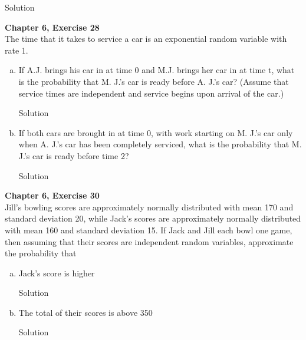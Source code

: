 \documentclass{article}
\begin{document}
\begin{spacing}{1.1}
\begin{homeworkProblem}
\begin{enumerate}[(a)]
\begin{homeworkSection}{Solution}
      \end{homeworkSection}
  \end{enumerate}
\end{homeworkProblem}

\newpage
\begin{homeworkProblem}
  {\bf Chapter 6, Exercise 28}\\
  The time that it takes to service a car is an exponential 
  random variable with rate 1.
  \begin{enumerate}[(a)]
    \item If A.J. brings his car in at time 0 and M.J.
    brings her car in at time t, what is the probability 
    that M. J.'s car is ready before A. J.'s car? 
    (Assume that service times are independent and service 
    begins upon arrival of the car.)
      \begin{homeworkSection}{Solution}
        
      \end{homeworkSection}
    \item If both cars are brought in at time 0, with work 
    starting on M. J.'s car only when A. J.'s car has been 
    completely serviced, what is the probability that M. J.'s 
    car is ready before time 2?
      \begin{homeworkSection}{Solution}
        
      \end{homeworkSection}
  \end{enumerate}
\end{homeworkProblem}

\newpage
\begin{homeworkProblem}
  {\bf Chapter 6, Exercise 30}\\
  Jill's bowling scores are approximately normally distributed with 
  mean 170 and standard deviation 20, while Jack's scores are 
  approximately normally distributed with mean 160 and standard 
  deviation 15. If Jack and Jill each bowl one game, then assuming 
  that their scores are independent random variables, approximate 
  the probability that
  \begin{enumerate}[(a)]
    \item Jack's score is higher
      \begin{homeworkSection}{Solution}
        
      \end{homeworkSection}
    \item The total of their scores is above 350
      \begin{homeworkSection}{Solution}
        
      \end{homeworkSection}
  \end{enumerate}
\end{homeworkProblem}

\end{spacing}
\end{document}
